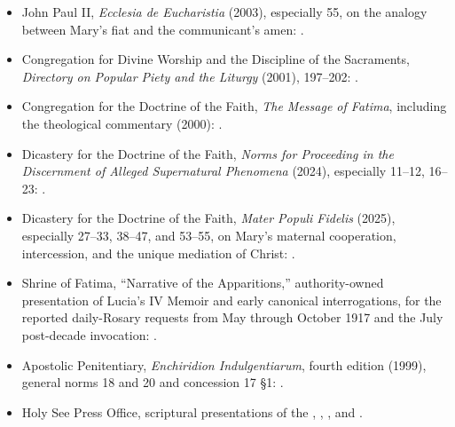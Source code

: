 \begin{itemize}
  \item John Paul II, \emph{Ecclesia de Eucharistia} (2003), especially 55, on the analogy between Mary's fiat and the communicant's amen: .
  \item Congregation for Divine Worship and the Discipline of the Sacraments, \emph{Directory on Popular Piety and the Liturgy} (2001), 197--202: .
  \item Congregation for the Doctrine of the Faith, \emph{The Message of Fatima}, including the theological commentary (2000): .
  \item Dicastery for the Doctrine of the Faith, \emph{Norms for Proceeding in the Discernment of Alleged Supernatural Phenomena} (2024), especially 11--12, 16--23: .
  \item Dicastery for the Doctrine of the Faith, \emph{Mater Populi Fidelis} (2025), especially 27--33, 38--47, and 53--55, on Mary's maternal cooperation, intercession, and the unique mediation of Christ: .
  \item Shrine of Fatima, ``Narrative of the Apparitions,'' authority-owned presentation of Lucia's IV Memoir and early canonical interrogations, for the reported daily-Rosary requests from May through October 1917 and the July post-decade invocation: .
  \item Apostolic Penitentiary, \emph{Enchiridion Indulgentiarum}, fourth edition (1999), general norms 18 and 20 and concession 17 \S1: .
  \item Holy See Press Office, scriptural presentations of the , , , and .
\end{itemize}

